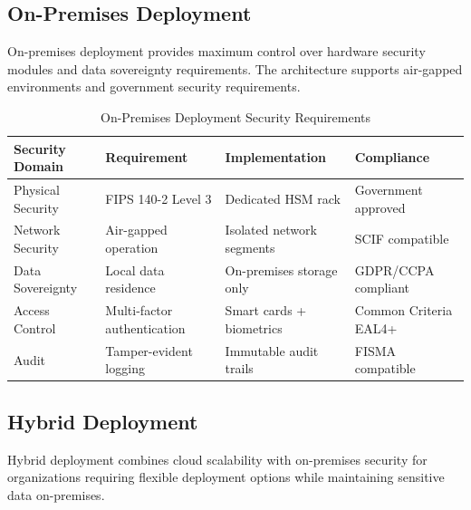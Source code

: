 \documentclass[12pt,a4paper,twoside]{book}
\begin{document}
\subsection{On-Premises Deployment}
\label{subsec:onprem-deployment}

On-premises deployment provides maximum control over hardware security modules and data sovereignty requirements. The architecture supports air-gapped environments and government security requirements.

\begin{table}[htbp]
\centering
\caption{On-Premises Deployment Security Requirements}
\label{tab:onprem-security}
\begin{tabular}{@{}llll@{}}
\toprule
\textbf{Security Domain} & \textbf{Requirement} & \textbf{Implementation} & \textbf{Compliance} \\
\midrule
Physical Security & FIPS 140-2 Level 3 & Dedicated HSM rack & Government approved \\
Network Security & Air-gapped operation & Isolated network segments & SCIF compatible \\
Data Sovereignty & Local data residence & On-premises storage only & GDPR/CCPA compliant \\
Access Control & Multi-factor authentication & Smart cards + biometrics & Common Criteria EAL4+ \\
Audit & Tamper-evident logging & Immutable audit trails & FISMA compatible \\
\bottomrule
\end{tabular}
\end{table}

\subsection{Hybrid Deployment}
\label{subsec:hybrid-deployment}

Hybrid deployment combines cloud scalability with on-premises security for organizations requiring flexible deployment options while maintaining sensitive data on-premises.
\end{document}
